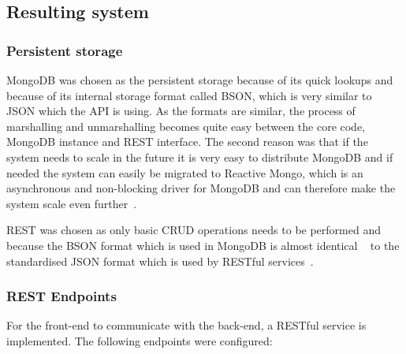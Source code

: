 \documentclass[a4paper,12pt]{article}
\newcounter{subsubsubsection}[subsubsection]
\begin{document}
\subsection{Resulting system}
\subsubsection{Persistent storage}
MongoDB was chosen as the persistent storage because of its quick lookups and because of its internal storage 
format called BSON, which is very similar to JSON which the API is using. As the formats are similar, the process of 
marshalling and unmarshalling becomes quite easy between the core code, MongoDB instance and REST interface. 
The second reason was that if the system needs to scale in the future it is very easy to distribute MongoDB and if 
needed the system can easily be migrated to Reactive Mongo, which is an asynchronous and 
non-blocking driver for MongoDB and can therefore make the system scale even further~\cite{REACTIVEMONGO}.

REST was chosen as only basic CRUD operations needs to be performed and because the BSON format which is used in 
MongoDB is almost identical ~\cite{BSON} to the standardised JSON format which is used by RESTful services~\cite{JSON}. 

\subsubsection{REST Endpoints}
For the front-end to communicate with the back-end, a RESTful service is implemented.
The following endpoints were configured:
\end{document}
